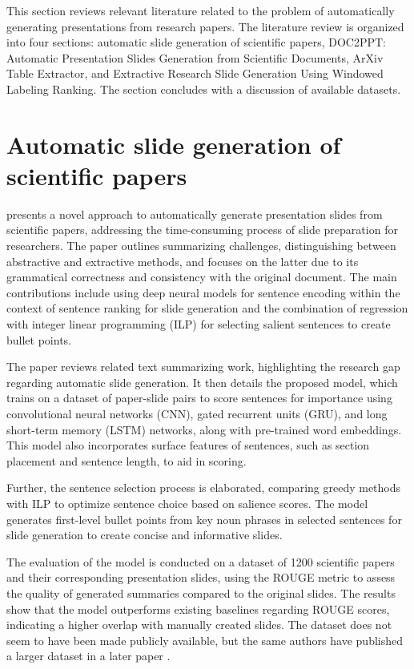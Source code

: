 This section reviews relevant literature related to the problem of automatically generating presentations from research papers. The literature review is organized into four sections: automatic slide generation of scientific papers, DOC2PPT: Automatic Presentation Slides Generation from Scientific Documents, ArXiv Table Extractor, and Extractive Research Slide Generation Using Windowed Labeling Ranking. The section concludes with a discussion of available datasets.

\section{Automatic slide generation of scientific papers}

\citet{Sefid:2019:K-CAP} presents a novel approach to automatically generate presentation slides from scientific papers, addressing the time-consuming process of slide preparation for researchers. The paper outlines summarizing challenges, distinguishing between abstractive and extractive methods, and focuses on the latter due to its grammatical correctness and consistency with the original document. The main contributions include using deep neural models for sentence encoding within the context of sentence ranking for slide generation and the combination of regression with integer linear programming (ILP) for selecting salient sentences to create bullet points.

The paper reviews related text summarizing work, highlighting the research gap regarding automatic slide generation. It then details the proposed model, which trains on a dataset of paper-slide pairs to score sentences for importance using convolutional neural networks (CNN), gated recurrent units (GRU), and long short-term memory (LSTM) networks, along with pre-trained word embeddings. This model also incorporates surface features of sentences, such as section placement and sentence length, to aid in scoring.

Further, the sentence selection process is elaborated, comparing greedy methods with ILP to optimize sentence choice based on salience scores. The model generates first-level bullet points from key noun phrases in selected sentences for slide generation to create concise and informative slides.

The evaluation of the model is conducted on a dataset of 1200 scientific papers and their corresponding presentation slides, using the ROUGE metric to assess the quality of generated summaries compared to the original slides. The results show that the model outperforms existing baselines regarding ROUGE scores, indicating a higher overlap with manually created slides. The dataset does not seem to have been made publicly available, but the same authors have published a larger dataset in a later paper \citep{Sefid:2021:arXiv}.

